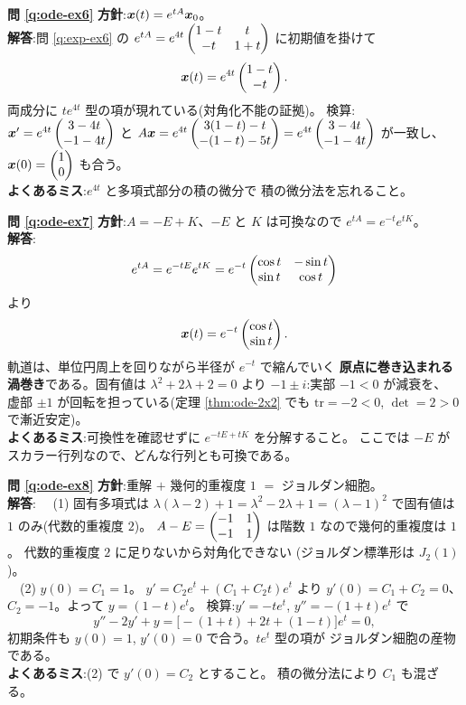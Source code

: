 \bigskip
\noindent\textbf{問 \ref{q:ode-ex6}}\quad
\textbf{方針}:$\bm{x}(t) = e^{tA}\bm{x}_0$。\\
\textbf{解答}:問 \ref{q:exp-ex6} の
$e^{tA} = e^{4t}\begin{pmatrix}1 - t & t \\ -t & 1 + t\end{pmatrix}$ に初期値を掛けて
\[
\bm{x}(t) = e^{4t}\begin{pmatrix}1 - t \\ -t\end{pmatrix}.
\]
両成分に $te^{4t}$ 型の項が現れている(対角化不能の証拠)。
検算:$\bm{x}' = e^{4t}\begin{pmatrix}3 - 4t \\ -1 - 4t\end{pmatrix}$ と
$A\bm{x} = e^{4t}\begin{pmatrix}3(1-t) - t \\ -(1-t) - 5t\end{pmatrix}
= e^{4t}\begin{pmatrix}3 - 4t \\ -1 - 4t\end{pmatrix}$ が一致し、
$\bm{x}(0) = \begin{pmatrix}1 \\ 0\end{pmatrix}$ も合う。\\
\textbf{よくあるミス}:$e^{4t}$ と多項式部分の積の微分で
積の微分法を忘れること。

\bigskip
\noindent\textbf{問 \ref{q:ode-ex7}}\quad
\textbf{方針}:$A = -E + K$、$-E$ と $K$ は可換なので
$e^{tA} = e^{-t}e^{tK}$。\\
\textbf{解答}:
\[
e^{tA} = e^{-tE}e^{tK}
= e^{-t}\begin{pmatrix}\cos t & -\sin t \\ \sin t & \cos t\end{pmatrix}
\]
より
\[
\bm{x}(t) = e^{-t}\begin{pmatrix}\cos t \\ \sin t\end{pmatrix}.
\]
軌道は、単位円周上を回りながら半径が $e^{-t}$ で縮んでいく
\textbf{原点に巻き込まれる渦巻き}である。固有値は
$\lambda^2 + 2\lambda + 2 = 0$ より $-1 \pm i$:実部 $-1 < 0$ が減衰を、
虚部 $\pm 1$ が回転を担っている(定理 \ref{thm:ode-2x2} でも
$\mathrm{tr} = -2 < 0$, $\det = 2 > 0$ で漸近安定)。\\
\textbf{よくあるミス}:可換性を確認せずに $e^{-tE+tK}$ を分解すること。
ここでは $-E$ がスカラー行列なので、どんな行列とも可換である。

\bigskip
\noindent\textbf{問 \ref{q:ode-ex8}}\quad
\textbf{方針}:重解 $+$ 幾何的重複度 $1$ $=$ ジョルダン細胞。\\
\textbf{解答}:
　(1) 固有多項式は $\lambda(\lambda - 2) + 1 = \lambda^2 - 2\lambda + 1
= (\lambda - 1)^2$ で固有値は $1$ のみ(代数的重複度 $2$)。
$A - E = \begin{pmatrix}-1 & 1 \\ -1 & 1\end{pmatrix}$ は階数 $1$ なので幾何的重複度は $1$。
代数的重複度 $2$ に足りないから対角化できない
(ジョルダン標準形は $J_2(1)$)。\\
　(2) $y(0) = C_1 = 1$。
$y' = C_2 e^{t} + (C_1 + C_2 t)e^{t}$ より $y'(0) = C_1 + C_2 = 0$、
$C_2 = -1$。よって $y = (1 - t)e^{t}$。
検算:$y' = -te^{t}$, $y'' = -(1 + t)e^{t}$ で
\[
y'' - 2y' + y = \bigl[-(1 + t) + 2t + (1 - t)\bigr]e^{t} = 0,
\]
初期条件も $y(0) = 1$, $y'(0) = 0$ で合う。$te^{t}$ 型の項が
ジョルダン細胞の産物である。\\
\textbf{よくあるミス}:(2) で $y'(0) = C_2$ とすること。
積の微分法により $C_1$ も混ざる。

